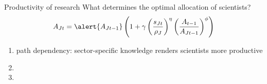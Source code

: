 \documentclass[11pt,aspectratio=169]{beamer}
\begin{document}
		
		\begin{frame}{Productivity of research}
			\vspace{-10mm}
			What determines the optimal allocation of scientists?
			\vspace{4mm}
			\pause
			\large
			\begin{align*}
				A_{Jt}=\alert{A_{Jt-1}}\left(1+\gamma\left(\frac{s_{Jt}}{\rho_J}\right)^\eta\left(\frac{A_{t-1}}{A_{Jt-1}}\right)^\phi\right)
			\end{align*}
			\normalsize
			\begin{enumerate}
				\item \alert{path dependency: sector-specific knowledge renders scientists more productive}
				\item[] %
				\item[] %
			\end{enumerate}
		\end{frame}
		
\end{document}
